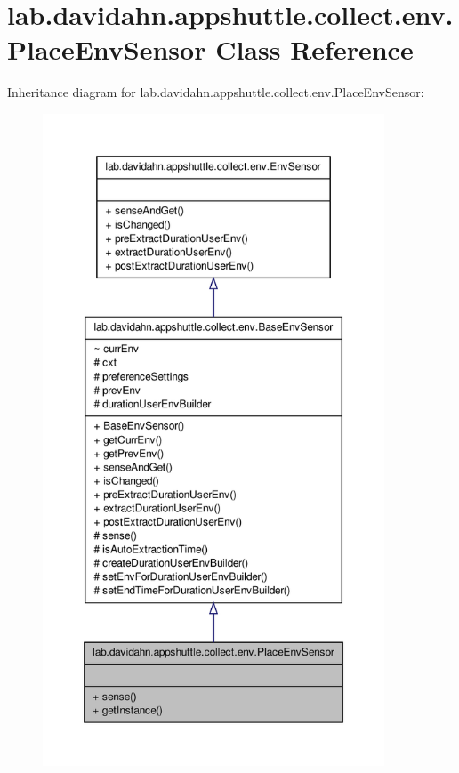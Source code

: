 \hypertarget{classlab_1_1davidahn_1_1appshuttle_1_1collect_1_1env_1_1_place_env_sensor}{\section{lab.\-davidahn.\-appshuttle.\-collect.\-env.\-Place\-Env\-Sensor \-Class \-Reference}
\label{classlab_1_1davidahn_1_1appshuttle_1_1collect_1_1env_1_1_place_env_sensor}
}


\-Inheritance diagram for lab.\-davidahn.\-appshuttle.\-collect.\-env.\-Place\-Env\-Sensor\-:
\nopagebreak
\begin{figure}[H]
\begin{center}
\leavevmode
\includegraphics[height=550pt]{classlab_1_1davidahn_1_1appshuttle_1_1collect_1_1env_1_1_place_env_sensor__inherit__graph}
\end{center}
\end{figure}


